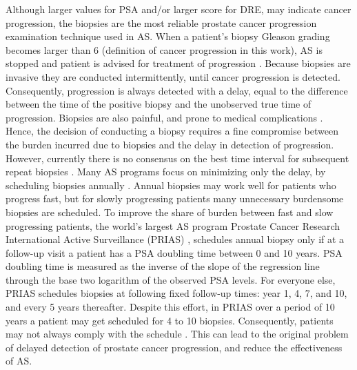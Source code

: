 Although larger values for PSA and/or larger score for DRE, may indicate cancer progression, the biopsies are the most reliable prostate cancer progression examination technique used in AS. When a patient's biopsy Gleason grading becomes larger than 6 (definition of cancer progression in this work), AS is stopped and patient is advised for treatment of progression \cite{bokhorst2015compliance}. Because biopsies are invasive they are conducted intermittently, until cancer progression is detected. Consequently, progression is always detected with a delay, equal to the difference between the time of the positive biopsy and the unobserved true time of progression. Biopsies are also painful, and prone to medical complications \cite{ehdaie2014impact}. Hence, the decision of conducting a biopsy requires a fine compromise between the burden incurred due to biopsies and the delay in detection of progression. However, currently there is no consensus on the best time interval for subsequent repeat biopsies \cite{loeb2014heterogeneity}. Many AS programs focus on minimizing only the delay, by scheduling biopsies annually \cite{welty2015extended}. Annual biopsies may work well for patients who progress fast, but for slowly progressing patients many unnecessary burdensome biopsies are scheduled. To improve the share of burden between fast and slow progressing patients, the world's largest AS program Prostate Cancer Research International Active Surveillance (PRIAS) \cite{bul2013active}, schedules annual biopsy only if at a follow-up visit a patient has a PSA doubling time between 0 and 10 years. PSA doubling time is measured as the inverse of the slope of the regression line through the base two logarithm of the observed PSA levels. For everyone else, PRIAS schedules biopsies at following fixed follow-up times: year 1, 4, 7, and 10, and every 5 years thereafter. Despite this effort, in PRIAS over a period of 10 years a patient may get scheduled for 4 to 10 biopsies. Consequently, patients may not always comply with the schedule \cite{bokhorst2015compliance}. This can lead to the original problem of delayed detection of prostate cancer progression, and reduce the effectiveness of AS.

